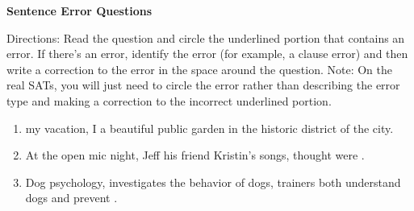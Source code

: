 \bigskip
\centerline{\textbf{Sentence Error Questions}}

\bigskip
Directions: Read the question and circle the underlined portion that contains an error. If there's an error, identify the error (for example, a clause error) and then write a correction to the error in the space around the question. Note: On the real SATs, you will just need to circle the error rather than describing the error type and making a correction to the incorrect underlined portion.

\begin{enumerate}
\item 

\begin{inparaenum}[A]
 my  vacation, I  a beautiful public garden  in the historic district of the city. 
\end{inparaenum}

\vfill\item 

\begin{inparaenum}[A]
At the open mic night, Jeff  his friend Kristin's songs,  thought were  . 
\end{inparaenum}

\vfill\item

\begin{inparaenum}[A]
Dog psychology,  investigates  the behavior of dogs,  trainers both understand dogs and prevent . 
\end{inparaenum}


\end{enumerate}
